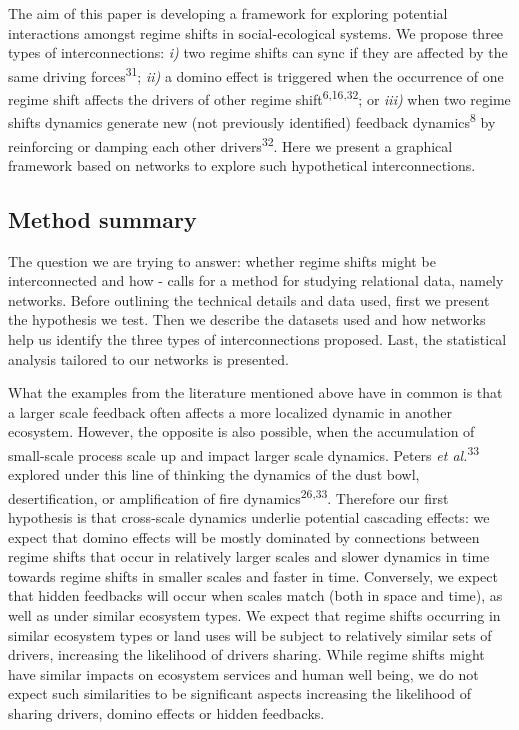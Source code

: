 \documentclass[9pt,]{article}
\begin{document}
The aim of this paper is developing a framework for exploring potential
interactions amongst regime shifts in social-ecological systems. We
propose three types of interconnections: \emph{i)} two regime shifts can
sync if they are affected by the same driving
forces\textsuperscript{31}; \emph{ii)} a domino effect is triggered when
the occurrence of one regime shift affects the drivers of other regime
shift\textsuperscript{6,16,32}; or \emph{iii)} when two regime shifts
dynamics generate new (not previously identified) feedback
dynamics\textsuperscript{8} by reinforcing or damping each other
drivers\textsuperscript{32}. Here we present a graphical framework based
on networks to explore such hypothetical interconnections.

\subsection{Method summary}\label{method-summary}

The question we are trying to answer: whether regime shifts might be
interconnected and how - calls for a method for studying relational
data, namely networks. Before outlining the technical details and data
used, first we present the hypothesis we test. Then we describe the
datasets used and how networks help us identify the three types of
interconnections proposed. Last, the statistical analysis tailored to
our networks is presented.

What the examples from the literature mentioned above have in common is
that a larger scale feedback often affects a more localized dynamic in
another ecosystem. However, the opposite is also possible, when the
accumulation of small-scale process scale up and impact larger scale
dynamics. Peters \emph{et al.}\textsuperscript{33} explored under this
line of thinking the dynamics of the dust bowl, desertification, or
amplification of fire dynamics\textsuperscript{26,33}. Therefore our
first hypothesis is that cross-scale dynamics underlie potential
cascading effects: we expect that domino effects will be mostly
dominated by connections between regime shifts that occur in relatively
larger scales and slower dynamics in time towards regime shifts in
smaller scales and faster in time. Conversely, we expect that hidden
feedbacks will occur when scales match (both in space and time), as well
as under similar ecosystem types. We expect that regime shifts occurring
in similar ecosystem types or land uses will be subject to relatively
similar sets of drivers, increasing the likelihood of drivers sharing.
While regime shifts might have similar impacts on ecosystem services and
human well being, we do not expect such similarities to be significant
aspects increasing the likelihood of sharing drivers, domino effects or
hidden feedbacks.
\end{document}
